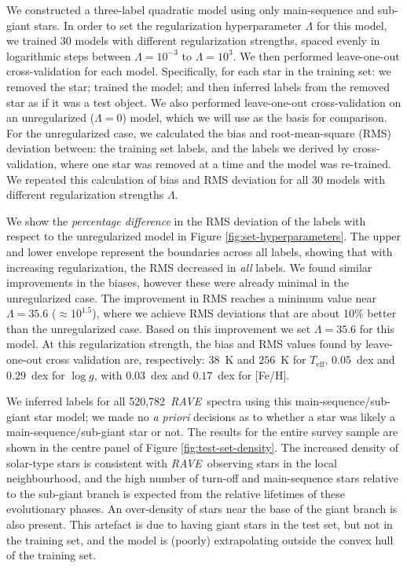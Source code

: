 \documentclass[preprint,trackchanges]{aastex}
\newcommand{\acronym}[1]{{\small{#1}}}
\newcommand{\project}[1]{\textsl{#1}}
\newcommand{\rave}{\project{\acronym{RAVE}}}
\newcommand{\teff}{T_{\mathrm{eff}}}
\newcommand{\logg}{\log g}
\newcommand{\Nspectra}{520,782}
\begin{document}
We constructed a three-label quadratic model using only main-sequence and sub-giant
stars. In order to set the regularization hyperparameter $\Lambda$ for this model, we 
trained 30 models with different regularization strengths, spaced evenly in logarithmic
steps between $\Lambda = 10^{-3}$ to $\Lambda = 10^{3}$.  We then performed leave-one-out 
cross-validation for each model.  Specifically, for each star in the training set: we 
removed the star; trained the model; and then inferred labels from the removed star as 
if it was a test object.  We also performed leave-one-out cross-validation on an 
unregularized ($\Lambda = 0$) model, which we will use as the basis for comparison.  
For the unregularized case, we calculated the bias and root-mean-square (RMS) deviation 
between: the training set labels, and the labels we derived by cross-validation, where 
one star was removed at a time and the model was re-trained.  We repeated this calculation
of bias and RMS deviation for all 30 models with different regularization strengths $\Lambda$. 


We show the \emph{percentage difference} in the RMS deviation of the labels with respect
to the unregularized model in Figure \ref{fig:set-hyperparameters}.  The upper 
and lower envelope represent the boundaries across all labels, showing that with increasing
regularization, the RMS decreased in \emph{all} labels.  We found similar
improvements in the biases, however these were already minimal in the unregularized
case.  The improvement in RMS reaches a minimum value near 
$\Lambda = 35.6$ ($\approx10^{1.5}$), where
we achieve RMS deviations that are about 10\% better than the unregularized case.
Based on this improvement we set $\Lambda = 35.6$ for this model.  At this regularization 
strength, the bias and RMS values found by leave-one-out
cross validation are, respectively: $38$~K and $256$~K for $\teff$, $0.05$~dex and 
$0.29$~dex for $\logg$, with $0.03$~dex and $0.17$~dex for [Fe/H].


We inferred labels for all \Nspectra\ \rave\ spectra using this main-sequence/sub-giant
star model; we made no \emph{a priori} decisions as to whether a star was likely a
main-sequence/sub-giant star or not.  The results for the entire survey sample are shown
in the centre panel of Figure \ref{fig:test-set-density}.  The increased density of 
solar-type stars is consistent with \rave\ observing stars in the local neighbourhood, 
and the high number of turn-off and main-sequence stars relative to the sub-giant branch 
is expected from the relative lifetimes of these evolutionary phases.  An over-density
of stars near the base of the giant branch is also present.  This artefact is due 
to having giant stars in the test set, but not in the training set, and the model is 
(poorly) extrapolating outside the convex hull of the training set.
\end{document}

